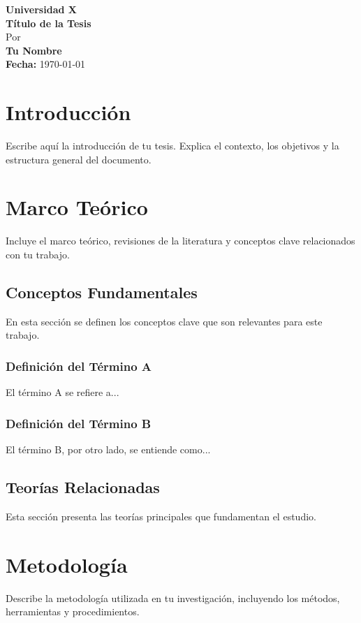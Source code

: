 \documentclass[12pt]{report}
\begin{document}
\begin{titlepage}
    \centering
    {\Large \textbf{Universidad X}}\\[2cm]
    {\Huge \textbf{Título de la Tesis}}\\[1.5cm]
    {\large Por}\\[0.5cm]
    {\Large \textbf{Tu Nombre}}\\[2cm]
    \vfill
    {\large \textbf{Fecha:} \today}
\end{titlepage}

\tableofcontents
\newpage

\chapter*{Introducción}
\hypertarget{introduccion}{}
Escribe aquí la introducción de tu tesis. Explica el contexto, los objetivos y la estructura general del documento.
\setcounter{chapter}{0}
\chapter{Marco Teórico}
Incluye el marco teórico, revisiones de la literatura y conceptos clave relacionados con tu trabajo.
\section{Conceptos Fundamentales}
En esta sección se definen los conceptos clave que son relevantes para este trabajo. 

\subsection{Definición del Término A}
El término A se refiere a...

\subsection{Definición del Término B}
El término B, por otro lado, se entiende como...

\section{Teorías Relacionadas}
Esta sección presenta las teorías principales que fundamentan el estudio.
\chapter{Metodología}
Describe la metodología utilizada en tu investigación, incluyendo los métodos, herramientas y procedimientos.
\end{document}

